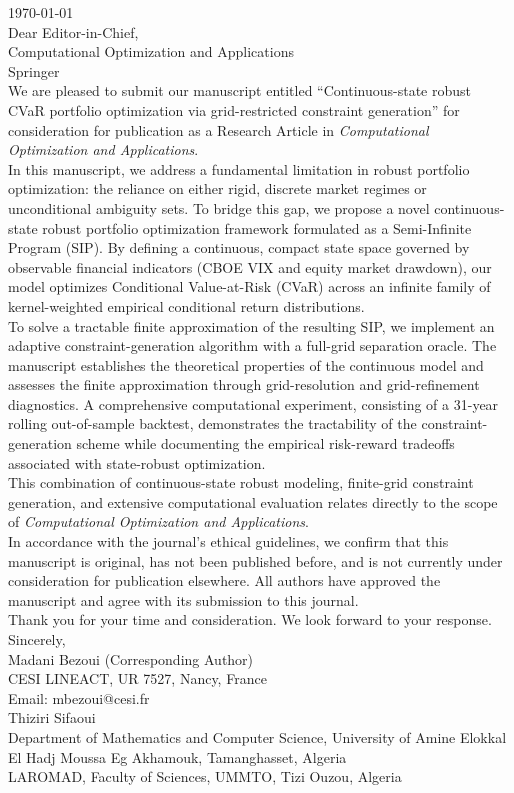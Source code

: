 \documentclass[11pt, a4paper]{article}
\begin{document}
\noindent \today\\[1cm]
Dear Editor-in-Chief,\\
Computational Optimization and Applications\\
Springer\\[0.5cm]
We are pleased to submit our manuscript entitled ``Continuous-state robust CVaR portfolio optimization via grid-restricted constraint generation'' for consideration for publication as a Research Article in \emph{Computational Optimization and Applications}.\\[0.3cm]
In this manuscript, we address a fundamental limitation in robust portfolio optimization: the reliance on either rigid, discrete market regimes or unconditional ambiguity sets. To bridge this gap, we propose a novel continuous-state robust portfolio optimization framework formulated as a Semi-Infinite Program (SIP). By defining a continuous, compact state space governed by observable financial indicators (CBOE VIX and equity market drawdown), our model optimizes Conditional Value-at-Risk (CVaR) across an infinite family of kernel-weighted empirical conditional return distributions.\\[0.3cm]
To solve a tractable finite approximation of the resulting SIP, we implement an adaptive constraint-generation algorithm with a full-grid separation oracle. The manuscript establishes the theoretical properties of the continuous model and assesses the finite approximation through grid-resolution and grid-refinement diagnostics. A comprehensive computational experiment, consisting of a 31-year rolling out-of-sample backtest, demonstrates the tractability of the constraint-generation scheme while documenting the empirical risk-reward tradeoffs associated with state-robust optimization.\\[0.3cm]
This combination of continuous-state robust modeling, finite-grid constraint generation, and extensive computational evaluation relates directly to the scope of \emph{Computational Optimization and Applications}.\\[0.3cm]
In accordance with the journal's ethical guidelines, we confirm that this manuscript is original, has not been published before, and is not currently under consideration for publication elsewhere. All authors have approved the manuscript and agree with its submission to this journal.\\[0.5cm]
Thank you for your time and consideration. We look forward to your response.\\[1cm]
Sincerely,\\[0.5cm]
Madani Bezoui (Corresponding Author)\\
CESI LINEACT, UR 7527, Nancy, France\\
Email: mbezoui@cesi.fr\\[0.5cm]
Thiziri Sifaoui\\
Department of Mathematics and Computer Science, University of Amine Elokkal El Hadj Moussa Eg Akhamouk, Tamanghasset, Algeria\\
LAROMAD, Faculty of Sciences, UMMTO, Tizi Ouzou, Algeria
\end{document}
